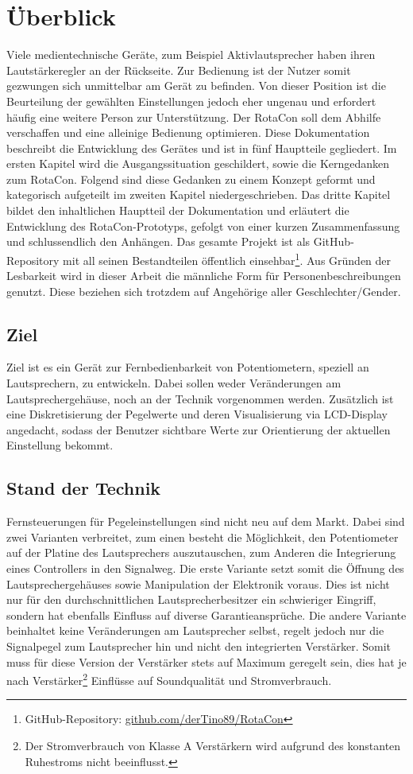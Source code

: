 \documentclass[11pt, titlepage]{report}
\begin{document}
	\chapter{Überblick}
		Viele medientechnische Geräte, zum Beispiel Aktivlautsprecher haben ihren Lautstärkeregler an der Rückseite. Zur Bedienung ist der Nutzer somit gezwungen sich unmittelbar am Gerät zu befinden. Von dieser Position ist die Beurteilung der gewählten Einstellungen jedoch eher ungenau und erfordert häufig eine weitere Person zur Unterstützung. Der RotaCon soll dem Abhilfe verschaffen und eine alleinige Bedienung optimieren. Diese Dokumentation beschreibt die Entwicklung des Gerätes und ist in fünf Hauptteile gegliedert. Im ersten Kapitel wird die Ausgangssituation geschildert, sowie die Kerngedanken zum RotaCon. Folgend sind diese Gedanken zu einem Konzept geformt und kategorisch aufgeteilt im zweiten Kapitel niedergeschrieben. Das dritte Kapitel bildet den inhaltlichen Hauptteil der Dokumentation und erläutert die Entwicklung des RotaCon-Prototyps, gefolgt von einer kurzen Zusammenfassung und schlussendlich den Anhängen. Das gesamte Projekt ist als GitHub-Repository mit all seinen Bestandteilen öffentlich einsehbar\footnote{GitHub-Repository: \protect\href{https://github.com/derTino89/RotaCon}{github.com/derTino89/RotaCon}}. 
		\newline Aus Gründen der Lesbarkeit wird in dieser Arbeit die männliche Form für Personenbeschreibungen genutzt.
		Diese beziehen sich trotzdem auf Angehörige aller Geschlechter/Gender.
	\section*{Ziel}
		Ziel ist es ein Gerät zur Fernbedienbarkeit von Potentiometern, speziell an Lautsprechern, zu entwickeln. Dabei sollen weder Veränderungen am Lautsprechergehäuse, noch an der Technik vorgenommen werden. Zusätzlich ist eine Diskretisierung der Pegelwerte und deren Visualisierung via LCD-Display angedacht, sodass der Benutzer sichtbare 
		Werte zur Orientierung der aktuellen Einstellung bekommt. 
	\section*{Stand der Technik}	
		Fernsteuerungen für Pegeleinstellungen sind nicht neu auf dem Markt. Dabei sind zwei Varianten verbreitet, zum einen besteht die Möglichkeit, den Potentiometer auf der Platine des Lautsprechers auszutauschen, zum Anderen die Integrierung eines Controllers in den Signalweg. Die erste Variante setzt somit die Öffnung des Lautsprechergehäuses sowie Manipulation der Elektronik voraus. Dies ist nicht nur für den durchschnittlichen
		Lautsprecherbesitzer ein schwieriger Eingriff, sondern hat ebenfalls Einfluss auf diverse Garantieansprüche. Die andere Variante beinhaltet keine Veränderungen am Lautsprecher selbst, regelt jedoch nur die Signalpegel zum Lautsprecher hin und nicht den integrierten Verstärker. Somit muss für diese Version der Verstärker stets auf Maximum geregelt sein, dies hat je nach Verstärker\footnote{Der Stromverbrauch von Klasse A Verstärkern wird aufgrund des konstanten Ruhestroms nicht beeinflusst.} Einflüsse auf Soundqualität und Stromverbrauch.
\end{document}
